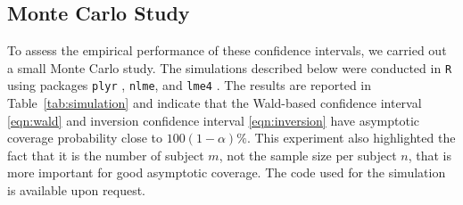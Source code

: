 \documentclass{article}\usepackage[]{graphicx}\usepackage[]{color}
\begin{document}
\subsection{Monte Carlo Study}
To assess the empirical performance of these confidence intervals, we carried out a small Monte Carlo study. The simulations described below were conducted in \texttt{R} using packages \texttt{plyr} \citep{wickham-plyr-2011}, \texttt{nlme}, and \texttt{lme4} \citep{bates-lme4-2014}.  The results are reported in Table~\ref{tab:simulation} and indicate that the Wald-based confidence interval \eqref{eqn:wald} and inversion confidence interval \eqref{eqn:inversion} have asymptotic coverage probability close to $100(1-\alpha)\%$.  This experiment also highlighted the fact that it is the number of subject $m$, not the sample size per subject $n$, that is more important for good asymptotic coverage.  The code used for the simulation is available upon request.
\end{document}
